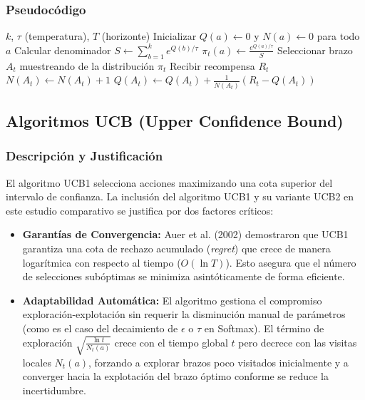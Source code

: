 \subsubsection{Pseudocódigo}
\begin{algorithm}
\caption{Algoritmo Softmax}
\begin{algorithmic}[1]
\small
\Require $k$, $\tau$ (temperatura), $T$ (horizonte)
\State Inicializar $Q(a) \gets 0$ y $N(a) \gets 0$ para todo $a$
    \State Calcular denominador $S \gets \sum_{b=1}^{k} e^{Q(b)/\tau}$
        \State $\pi_t(a) \gets \frac{e^{Q(a)/\tau}}{S}$
    \EndFor
    \State Seleccionar brazo $A_t$ muestreando de la distribución $\pi_t$
    \State Recibir recompensa $R_t$
    \State $N(A_t) \gets N(A_t) + 1$
    \State $Q(A_t) \gets Q(A_t) + \frac{1}{N(A_t)} (R_t - Q(A_t))$
\EndFor
\end{algorithmic}
\end{algorithm}

\subsection{Algoritmos UCB (Upper Confidence Bound)}

\subsubsection{Descripción y Justificación}
El algoritmo UCB1 selecciona acciones maximizando una cota superior del intervalo de confianza. 
La inclusión del algoritmo UCB1 y su variante UCB2 en este estudio comparativo se justifica por 
dos factores críticos:

\begin{itemize}
    \item \textbf{Garantías de Convergencia:} Auer et al. (2002) \cite{auer2002finitetime}  demostraron que UCB1 garantiza una cota 
    de rechazo acumulado (\textit{regret}) que crece de manera logarítmica con respecto al tiempo ($O(\ln T)$). 
    Esto asegura que el número de selecciones subóptimas se minimiza asintóticamente de forma eficiente.
    
    \item \textbf{Adaptabilidad Automática:} El algoritmo gestiona el compromiso exploración-explotación sin 
    requerir la disminución manual de parámetros (como es el caso del decaimiento de $\epsilon$ o $\tau$ en Softmax). 
    El término de exploración $\sqrt{\frac{\ln t}{N_t(a)}}$ crece con el tiempo global $t$
    pero decrece con las visitas locales $N_t(a)$, forzando a explorar brazos poco 
    visitados inicialmente y a converger hacia la explotación del brazo óptimo conforme se reduce la incertidumbre.
\end{itemize}

